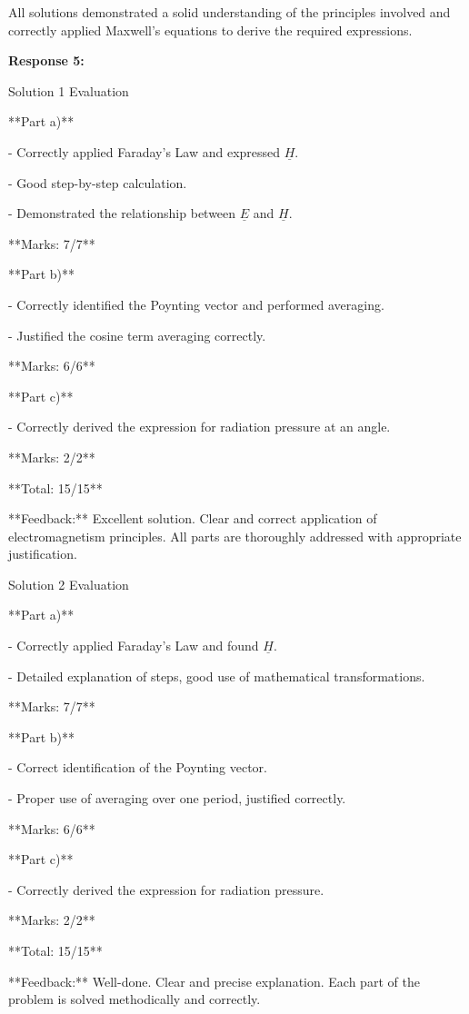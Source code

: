\documentclass[a4paper,11pt]{article}
\begin{document}
All solutions demonstrated a solid understanding of the principles involved and correctly applied Maxwell's equations to derive the required expressions.

\bigskip
\textbf{Response 5:}

Solution 1 Evaluation

**Part a)**

- Correctly applied Faraday's Law and expressed \( \underline{H} \).

- Good step-by-step calculation.

- Demonstrated the relationship between \(\underline{E}\) and \(\underline{H}\).

**Marks: 7/7**

**Part b)**

- Correctly identified the Poynting vector and performed averaging.

- Justified the cosine term averaging correctly.

**Marks: 6/6**

**Part c)**

- Correctly derived the expression for radiation pressure at an angle.

**Marks: 2/2**

**Total: 15/15**

**Feedback:** Excellent solution. Clear and correct application of electromagnetism principles. All parts are thoroughly addressed with appropriate justification.

Solution 2 Evaluation

**Part a)**

- Correctly applied Faraday's Law and found \(\underline{H}\).

- Detailed explanation of steps, good use of mathematical transformations.

**Marks: 7/7**

**Part b)**

- Correct identification of the Poynting vector.

- Proper use of averaging over one period, justified correctly.

**Marks: 6/6**

**Part c)**

- Correctly derived the expression for radiation pressure.

**Marks: 2/2**

**Total: 15/15**

**Feedback:** Well-done. Clear and precise explanation. Each part of the problem is solved methodically and correctly.
\end{document}
